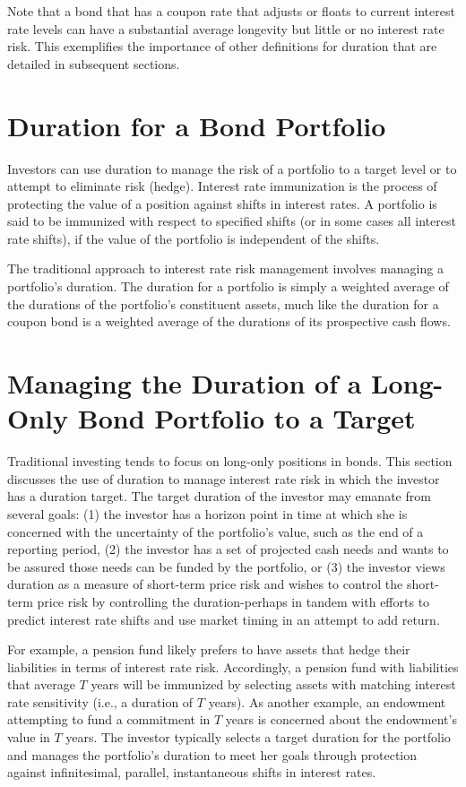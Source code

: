 \documentclass[11pt]{article}
\begin{document}
Note that a bond that has a coupon rate that adjusts or floats to current interest rate levels can have a substantial average longevity but little or no interest rate risk. This exemplifies the importance of other definitions for duration that are detailed in subsequent sections.

\section*{Duration for a Bond Portfolio}
Investors can use duration to manage the risk of a portfolio to a target level or to attempt to eliminate risk (hedge). Interest rate immunization is the process of protecting the value of a position against shifts in interest rates. A portfolio is said to be immunized with respect to specified shifts (or in some cases all interest rate shifts), if the value of the portfolio is independent of the shifts.

The traditional approach to interest rate risk management involves managing a portfolio's duration. The duration for a portfolio is simply a weighted average of the durations of the portfolio's constituent assets, much like the duration for a coupon bond is a weighted average of the durations of its prospective cash flows.

\section*{Managing the Duration of a Long-Only Bond Portfolio to a Target}
Traditional investing tends to focus on long-only positions in bonds. This section discusses the use of duration to manage interest rate risk in which the investor has a duration target. The target duration of the investor may emanate from several goals: (1) the investor has a horizon point in time at which she is concerned with the uncertainty of the portfolio's value, such as the end of a reporting period, (2) the investor has a set of projected cash needs and wants to be assured those needs can be funded by the portfolio, or (3) the investor views duration as a measure of short-term price risk and wishes to control the short-term price risk by controlling the duration-perhaps in tandem with efforts to predict interest rate shifts and use market timing in an attempt to add return.

For example, a pension fund likely prefers to have assets that hedge their liabilities in terms of interest rate risk. Accordingly, a pension fund with liabilities that average $T$ years will be immunized by selecting assets with matching interest rate sensitivity (i.e., a duration of $T$ years). As another example, an endowment attempting to fund a commitment in $T$ years is concerned about the endowment's value in $T$ years. The investor typically selects a target duration for the portfolio and manages the portfolio's duration to meet her goals through protection against infinitesimal, parallel, instantaneous shifts in interest rates.
\end{document}
